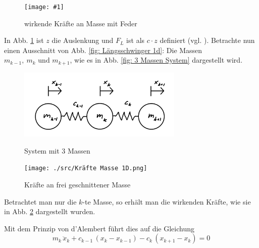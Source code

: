 \documentclass[ngerman,BCOR=4mm]{tudscrreprt}
\newcommand{\bild}[4]{
      \begin{figure}[!htp]
            \centering
            \texttt{[image: \#1]}
            \caption{#3}
            #4
      \end{figure}
}
\theoremstyle{plain} %
\theoremstyle{definition} %
\theoremstyle{remark}
\begin{document}
            \bild{./src/Federkraft und Trägheitskraft.png}{0.4}{wirkende Kräfte an Masse mit Feder \cite{federkraft}}{\label{fig: KräfteAnFeder}}
            
            In Abb. \ref{fig: KräfteAnFeder} ist $z$ die Auslenkung und $F_L$ ist als $c\cdot z$ definiert (vgl. \cite{federkraft}).
            Betrachte nun einen Ausschnitt von Abb. \ref{fig: Längsschwinger 1d}: Die Massen $m_{k-1},\ m_k\text{ und }m_{k+1}$, wie es in Abb. \ref{fig: 3 Massen System} dargestellt wird.

            \begin{figure}[ht]
                  \centering
                  \begin{minipage}[ht]{0.49\linewidth}
                        \centering
                        \includegraphics[width=0.7\textwidth, keepaspectratio]{./src/3 Massen System.png}
                        \caption{System mit 3 Massen}
                        \label{fig: 3 Massen System}
                  \end{minipage}
                  \hfill
                  \begin{minipage}[ht]{0.49\linewidth}
                        \centering
                        \texttt{[image: ./src/Kräfte Masse 1D.png]}
                        \caption{Kräfte an frei geschnittener Masse}
                        \label{fig: Kräfte Masse 1D}
                  \end{minipage}
            \end{figure}

            Betrachtet man nur die $k$-te Masse, so erhält man die wirkenden Kräfte, wie sie in Abb. \ref{fig: Kräfte Masse 1D} dargestellt wurden.

            Mit dem Prinzip von d'Alembert führt dies auf die Gleichung
            \begin{equation}
                  \label{eqn: Gl für kte Masse}
                  m_k\,\ddot x_k + c_{k-1}\,(x_k-x_{k-1}) - c_k\,(x_{k+1}-x_k) = 0
            \end{equation}
\end{document}
